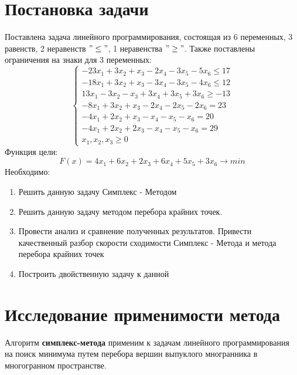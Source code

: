 \documentclass{article}
\begin{document}
	\newpage
	\tableofcontents
	\newpage
	\section{Постановка задачи}
     Поставлена задача линейного программирования, состоящая из 6 переменных, 3 равенств, 2 неравенств $"\leq "$, 1 неравенства $"\geq"$. Также поставлены ограничения на знаки для 3 переменных:
    \begin{equation*}
     \begin{cases}
      -23x_1 + 3x_2 + x_3 - 2x_4 - 3x_5 - 5x_6\le 17
      \\
      -18x_1 + 3x_2 + x_3 - 3x_4 - 3x_5 - 4x_6\le 12
       \\
       13x_1 - 3x_2 - x_3 + 3x_4 + 3x_5 +3x_6\ge -13
       \\
       -8x_1 + 3x_2 + x_3 - 2x_4 - 2x_5 -2x_6 = 23
       \\
       -4x_1 + 2x_2 + x_3 - x_4 - x_5 - x_6 = 20
       \\
       -4x_1 + 2x_2 + 2x_3 - x_4 - x_5 -x_6 = 29
       \\
       x_1, x_2, x_3 \ge 0
     \end{cases}
    \end{equation*}
    Функция цели:
    \begin{equation}
    F(x) =  4x_1 + 6x_2 + 2x_3 + 6x_4 + 5x_5 + 3x_6\longrightarrow min
    \end{equation}
    Необходимо:
    \begin{enumerate}
        \item Решить данную задачу Симплекс - Методом
        \item Решить данную задачу методом перебора крайних точек.
        \item Провести анализ и сравнение полученных результатов. Привести качественный разбор скорости сходимости Симплекс - Метода и метода перебора крайних точек
        \item Построить двойственную задачу к данной
    \end{enumerate}

	\section{Исследование применимости метода}
    Алгоритм \textbf{симплекс-метода} применим к задачам линейного программирования на поиск минимума путем перебора вершин выпуклого многранника в многогранном пространстве.
\end{document}
